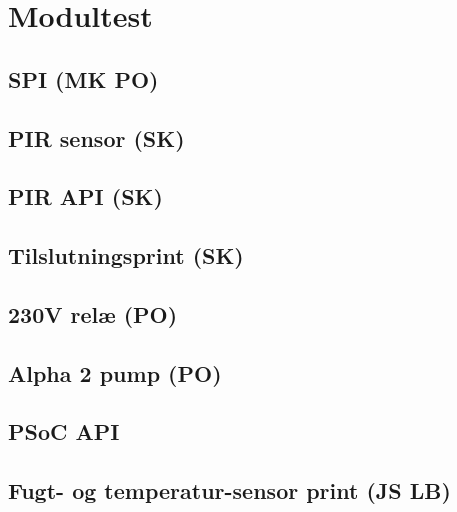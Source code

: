 \chapter{Modultest}

\section{SPI (MK PO)}


\section{PIR sensor (SK)}


\section{PIR API (SK)}


\section{Tilslutningsprint (SK)}


\section{230V relæ (PO)}


\section{Alpha 2 pump (PO)}


\section{PSoC API}


\section{Fugt- og temperatur-sensor print (JS LB)}




